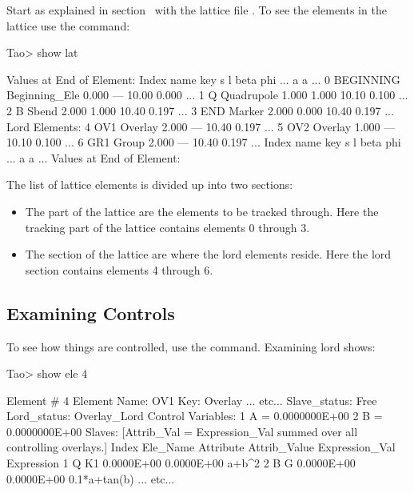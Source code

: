 \documentclass{hitec}
\begin{document}
Start \tao as explained in section~ with the lattice file . To
see the elements in the lattice use the  command:
\begin{code}
Tao> show lat

      Values at End of Element:
 Index  name      key                       s       l    beta     phi ...
                                                            a       a ...
     0  BEGINNING Beginning_Ele         0.000     ---   10.00   0.000 ...
     1  Q         Quadrupole            1.000   1.000   10.10   0.100 ...
     2  B         Sbend                 2.000   1.000   10.40   0.197 ...
     3  END       Marker                2.000   0.000   10.40   0.197 ...
Lord Elements:
     4  OV1       Overlay               2.000     ---   10.40   0.197 ...
     5  OV2       Overlay               1.000     ---   10.10   0.100 ...
     6  GR1       Group                 2.000     ---   10.40   0.197 ...
 Index  name      key                       s       l    beta     phi ...
                                                            a       a ...
      Values at End of Element:
\end{code}

The list of lattice elements is divided up into two sections:
\vspace{-10 pt}
\begin{itemize}
\item
The  part of the lattice are the elements to be tracked through. Here the tracking part of
the lattice contains elements 0 through 3.
\item
The  section of the lattice are where the lord elements reside.  Here the lord section contains
elements 4 through 6.
\end{itemize}

\subsection{Examining Controls}

To see how things are controlled, use the  command. Examining lord  shows:
\begin{code}
Tao> show ele 4

 Element #                4
 Element Name: OV1
 Key: Overlay
... etc...
Slave_status: Free
Lord_status:  Overlay_Lord
Control Variables:
    1   A                                         =  0.0000000E+00
    2   B                                         =  0.0000000E+00
Slaves: [Attrib_Val = Expression_Val summed over all controlling overlays.]
   Index   Ele_Name  Attribute   Attrib_Value  Expression_Val    Expression
       1   Q         K1            0.0000E+00      0.0000E+00    a+b^2
       2   B         G             0.0000E+00      0.0000E+00    0.1*a+tan(b)
... etc...
\end{code}
\end{document}

